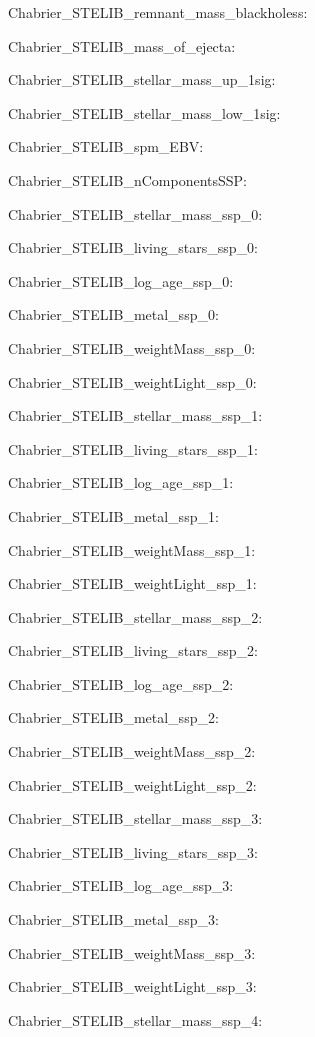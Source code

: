 \item Chabrier\_STELIB\_remnant\_mass\_blackholess: 
\item Chabrier\_STELIB\_mass\_of\_ejecta: 
\item Chabrier\_STELIB\_stellar\_mass\_up\_1sig: 
\item Chabrier\_STELIB\_stellar\_mass\_low\_1sig: 
\item Chabrier\_STELIB\_spm\_EBV: 
\item Chabrier\_STELIB\_nComponentsSSP: 
\item Chabrier\_STELIB\_stellar\_mass\_ssp\_0: 
\item Chabrier\_STELIB\_living\_stars\_ssp\_0: 
\item Chabrier\_STELIB\_log\_age\_ssp\_0: 
\item Chabrier\_STELIB\_metal\_ssp\_0: 
\item Chabrier\_STELIB\_weightMass\_ssp\_0: 
\item Chabrier\_STELIB\_weightLight\_ssp\_0: 
\item Chabrier\_STELIB\_stellar\_mass\_ssp\_1: 
\item Chabrier\_STELIB\_living\_stars\_ssp\_1: 
\item Chabrier\_STELIB\_log\_age\_ssp\_1: 
\item Chabrier\_STELIB\_metal\_ssp\_1: 
\item Chabrier\_STELIB\_weightMass\_ssp\_1: 
\item Chabrier\_STELIB\_weightLight\_ssp\_1: 
\item Chabrier\_STELIB\_stellar\_mass\_ssp\_2: 
\item Chabrier\_STELIB\_living\_stars\_ssp\_2: 
\item Chabrier\_STELIB\_log\_age\_ssp\_2: 
\item Chabrier\_STELIB\_metal\_ssp\_2: 
\item Chabrier\_STELIB\_weightMass\_ssp\_2: 
\item Chabrier\_STELIB\_weightLight\_ssp\_2: 
\item Chabrier\_STELIB\_stellar\_mass\_ssp\_3: 
\item Chabrier\_STELIB\_living\_stars\_ssp\_3: 
\item Chabrier\_STELIB\_log\_age\_ssp\_3: 
\item Chabrier\_STELIB\_metal\_ssp\_3: 
\item Chabrier\_STELIB\_weightMass\_ssp\_3: 
\item Chabrier\_STELIB\_weightLight\_ssp\_3: 
\item Chabrier\_STELIB\_stellar\_mass\_ssp\_4: 
